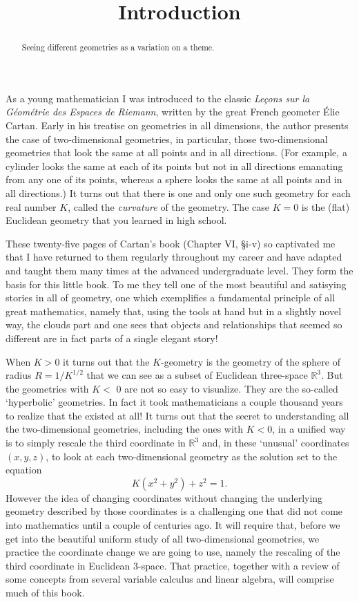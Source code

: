 \documentclass{ximera}
\title{Introduction}
\begin{document}
\begin{abstract}
Seeing different geometries as a variation on a theme.
\end{abstract}
\maketitle


As a young mathematician I was introduced to the classic \textit{Le\c{c}ons
sur la G\'{e}om\'{e}trie des Espaces de Riemann}, written by the great French
geometer \'{E}lie Cartan. Early in his treatise on geometries in all
dimensions, the author presents the case of two-dimensional geometries, in
particular, those two-dimensional geometries that look the same at all points
and in all directions. (For example, a cylinder looks the same at each of its
points but not in all directions emanating from any one of its points, whereas
a sphere looks the same at all points and in all directions.) It turns out
that there is one and only one such geometry for each real number $K$, called
the \textit{curvature} of the geometry. The case $K=0$ is the (flat) Euclidean
geometry that you learned in high school.

These twenty-five pages of Cartan's book (Chapter VI, \S i-v) so captivated me
that I have returned to them regularly throughout my career and have adapted
and taught them many times at the advanced undergraduate level. They form the
basis for this little book. To me they tell one of the most beautiful and
satisying stories in all of geometry, one which exemplifies a fundamental
principle of all great mathematics, namely that, using the tools at hand but
in a slightly novel way, the clouds part and one sees that objects and
relationships that seemed so different are in fact parts of a single elegant story!

When $K>0$ it turns out that the $K$-geometry is the geometry of the sphere of
radius $R=1/K^{1/2}$ that we can see as a subset of Euclidean three-space
$\mathbb{R}^{3}$. But the geometries with $K<$ $0$ are not so easy to
visualize. They are the so-called `hyperbolic' geometries. In fact it took
mathematicians a couple thousand years to realize that the existed at all! It
turns out that the secret to understanding all the two-dimensional geometries,
including the ones with $K<0$, in a unified way is to simply rescale the third
coordinate in $\mathbb{R}^{3}$ and, in these `unusual' coordinates $\left(
x,y,z\right)  $, to look at each two-dimensional geometry as the solution set
to the equation%
\[
K\left(  x^{2}+y^{2}\right)  +z^{2}=1.
\]
However the idea of changing coordinates without changing the underlying
geometry described by those coordinates is a challenging one that did not come
into mathematics until a couple of centuries ago. It will require that, before
we get into the beautiful uniform study of all two-dimensional geometries, we
practice the coordinate change we are going to use, namely the rescaling of
the third coordinate in Euclidean $3$-space. That practice, together with a
review of some concepts from several variable calculus and linear algebra,
will comprise much of this book.
\end{document}
